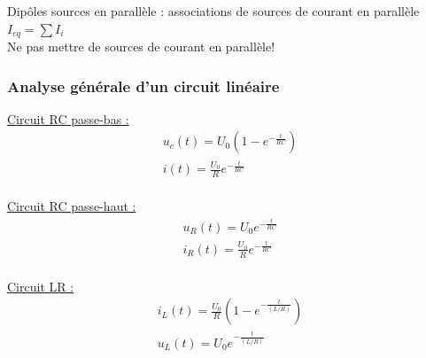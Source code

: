 \documentclass[../main.tex]{subfiles}
\begin{document}
Dipôles sources en parallèle : associations de sources de courant en parallèle $I_{eq} = \sum I_i$\\
\warning Ne pas mettre de sources de courant en parallèle!\\

\subsubsection{Analyse générale d'un circuit linéaire}
\quad \underline{Circuit RC passe-bas :}\\
\begin{equation}
\begin{gathered}
    u_c(t) = U_0 (1-e^{-\frac{t}{RC}})\\
    i(t) = \frac{U_0}{R} e^{-\frac{t}{RC}}\\
    \end{gathered}
\end{equation}

\quad \underline{Circuit RC passe-haut :}\\
\begin{equation}
    \begin{gathered}
        u_R(t) = U_0 e^{-\frac{t}{RC}}\\
        i_R(t) = \frac{U_0}{R} e^{-\frac{t}{RC}}\\
    \end{gathered}
\end{equation}

\quad \underline{Circuit LR :}\\
\begin{equation}
    \begin{gathered}
        i_L(t) = \frac{U_0}{R} (1-e^{-\frac{t}{(L/R)}})\\
        u_L(t) = U_0e^{-\frac{t}{(L/R)}}\\
    \end{gathered}
\end{equation}
\end{document}
